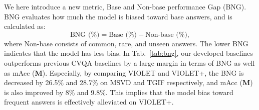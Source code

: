 \documentclass[10pt,twocolumn,letterpaper]{article}
\begin{document}
We here introduce a new metric, Base and Non-base performance Gap (BNG).
BNG evaluates how much the model is biased toward base answers, and is calculated as:
\begin{equation}
    \text{BNG (\%)} = \text{Base (\%)} - \text{Non-base (\%)},
\end{equation}
where Non-base consists of common, rare, and unseen answers.
The lower BNG indicates that the model has less bias.
In Tab.~\ref{tab:bng}, our developed baselines outperforms previous CVQA baselines by a large margin in terms of BNG as well as mAcc (\textbf{M}).
Especially, by comparing VIOLET and VIOLET+, the BNG is decreased by 26.5\% and 28.7\% on MSVD and TGIF respectively, and mAcc (\textbf{M}) is also improved by 8\% and 9.8\%.
This implies that the model bias toward frequent answers is effectively alleviated on VIOLET+.
 
\end{document}

